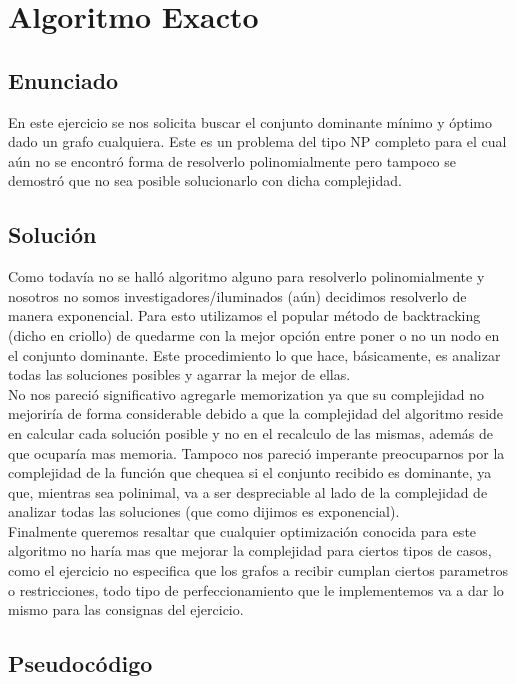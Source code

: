 \section{Algoritmo Exacto}

\subsection{Enunciado}
En este ejercicio se nos solicita buscar el conjunto dominante mínimo y óptimo dado un grafo cualquiera. Este es un problema del tipo NP completo 
para el cual aún no se encontró forma de resolverlo polinomialmente pero tampoco se demostró que no sea posible solucionarlo con dicha complejidad.

\subsection{Soluci\'on}
Como todavía no se halló algoritmo alguno para resolverlo polinomialmente y nosotros no somos investigadores/iluminados (aún) decidimos resolverlo
de manera exponencial. Para esto utilizamos el popular método de backtracking (dicho en criollo) de quedarme con la mejor opción entre poner o no un nodo en el 
conjunto dominante. Este procedimiento lo que hace, básicamente, es analizar todas las soluciones posibles y agarrar la mejor de ellas.  \\
No nos pareció significativo agregarle memorization ya que su complejidad no mejoriría de forma considerable debido a que la complejidad del algoritmo reside en calcular cada solución posible y no en el recalculo de las mismas, además de que ocuparía mas memoria. Tampoco nos pareció imperante preocuparnos por la complejidad de la función que chequea si el conjunto recibido es dominante, ya que, mientras sea polinimal, va a ser despreciable al lado de la complejidad de analizar todas las soluciones (que como dijimos es exponencial). \\
Finalmente queremos resaltar que cualquier optimización conocida para este algoritmo no haría mas que mejorar la complejidad para ciertos tipos de casos, como el ejercicio no especifica que los grafos a recibir cumplan ciertos parametros o restricciones, todo tipo de perfeccionamiento que le implementemos va a dar lo mismo para las consignas del ejercicio.

\subsection{Pseudocódigo}


